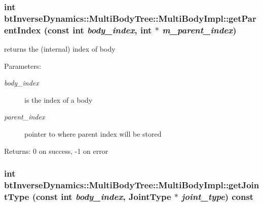  \hypertarget{classbt_inverse_dynamics_1_1_multi_body_tree_1_1_multi_body_impl_ce5ed2225ecc96810f7b385ada048dd6}{
\subsubsection[getParentIndex]{\setlength{\rightskip}{0pt plus 5cm}int btInverseDynamics::MultiBodyTree::MultiBodyImpl::getParentIndex (const int {\em body\_\-index}, \/  int $\ast$ {\em m\_\-parent\_\-index})}}
\label{classbt_inverse_dynamics_1_1_multi_body_tree_1_1_multi_body_impl_ce5ed2225ecc96810f7b385ada048dd6}


returns the (internal) index of body \begin{Desc}
\item[Parameters:]
\begin{description}
\item[{\em body\_\-index}]is the index of a body \item[{\em parent\_\-index}]pointer to where parent index will be stored \end{description}
\end{Desc}
\begin{Desc}
\item[Returns:]0 on success, -1 on error \end{Desc}
 \hypertarget{classbt_inverse_dynamics_1_1_multi_body_tree_1_1_multi_body_impl_74c65f858a7a5c93466f6d02a23b4663}{
\subsubsection[getJointType]{\setlength{\rightskip}{0pt plus 5cm}int btInverseDynamics::MultiBodyTree::MultiBodyImpl::getJointType (const int {\em body\_\-index}, \/  JointType $\ast$ {\em joint\_\-type}) const}}
\label{classbt_inverse_dynamics_1_1_multi_body_tree_1_1_multi_body_impl_74c65f858a7a5c93466f6d02a23b4663}



